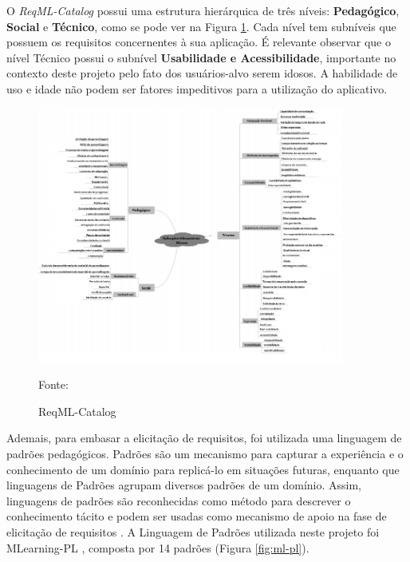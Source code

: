 O \textit{ReqML-Catalog} possui uma estrutura hierárquica de três níveis: \textbf{Pedagógico}, \textbf{Social} e \textbf{Técnico}, como se pode ver na Figura \ref{fig:reqML}. Cada nível tem subníveis que possuem os requisitos concernentes à sua aplicação. É relevante observar que o nível Técnico possui o subnível \textbf{Usabilidade e Acessibilidade}, importante no contexto deste projeto pelo fato dos usuários-alvo serem idosos. A habilidade de uso e idade não podem ser fatores impeditivos para a utilização do aplicativo.

\begin{figure}[H]
\centering
    \caption{ReqML-Catalog}
    \label{fig:reqML}
    \includegraphics[width=0.9\textwidth]{Figuras/reqML-catalog.png}
    
    Fonte: \cite{soad2017reqml}
\end{figure}

Ademais, para embasar a elicitação de requisitos, foi utilizada uma linguagem de padrões pedagógicos. Padrões são um mecanismo para capturar a experiência e o conhecimento de um domínio para replicá-lo em situações futuras, enquanto que linguagens de Padrões agrupam diversos padrões de um domínio. Assim, linguagens de padrões são reconhecidas como método para descrever o conhecimento tácito e podem ser usadas como mecanismo de apoio na fase de elicitação de requisitos
\citep{Pressman2014}. A Linguagem de Padrões utilizada neste projeto foi MLearning-PL \citep{Fioravanti2017_plop}, composta por 14 padrões (Figura \ref{fig:ml-pl}). 


